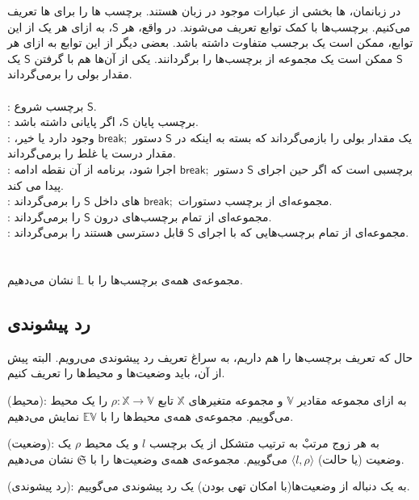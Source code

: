 در زبانمان، ها بخشی از عبارات موجود در زبان هستند. برچسب ها را برای ها تعریف می‌کنیم. برچسب‌ها با کمک توابع  تعریف می‌شوند. در‌ واقع، هر $\mathsf{S}$، به ازای هر یک از این توابع، ممکن است یک برجسب متفاوت داشته باشد. بعضی دیگر از این توابع به ازای هر $\mathsf{S}$ ممکن است یک مجموعه از برچسب‌ها را برگردانند. یکی از آن‌ها هم با گرفتن $\mathsf{S}$ یک مقدار بولی را بر‌می‌گرداند. 
\\\\
 : برچسب شروع $\mathsf{S}$.\\
 : برچسب پایان $\mathsf{S}$، اگر پایانی داشته باشد.\\
 : یک مقدار بولی را باز‌‌می‌گرداند که بسته به اینکه در $\mathsf{S}$ دستور $\mathsf{break;}$ وجود دارد یا خیر، مقدار درست یا غلط را بر‌می‌گرداند.\\
 : 
برچسبی است که اگر حین اجرای $\mathsf{S}$ دستور $\mathsf{break;}$ اجرا شود، برنامه از آن نقطه ادامه پیدا می کند.\\
 :
مجموعه‌ای از برچسب دستورات
$\mathsf{break;}$
های داخل $\mathsf{S}$ را بر‌می‌گرداند.\\
 : مجموعه‌ای از تمام برچسب‌های درون $\mathsf{S}$ را برمی‌گرداند.\\
 : مجموعه‌ای از تمام بر‌چسب‌هایی که با اجرای $\mathsf{S}$ قابل دسترسی هستند را بر‌می‌گرداند.\\\\\\
مجموعه‌ی همه‌ی برچسب‌ها را با 
$\mathbb{L}$
نشان می‌دهیم.

\subsection{رد پیشوندی}


حال که تعریف برچسب‌ها را هم داریم، به سراغ تعریف رد پیشوندی می‌رویم. البته پیش از آن، باید وضعیت‌ها و محیط‌ها را تعریف کنیم.
\begin{defn}
	(محیط): به ازای مجموعه مقادیر $\mathbb{V}$ و مجموعه متغیرهای $\mathbb{X}$ تابع 
	$\rho : \mathbb{X} \rightarrow \mathbb{V}$ 
	را یک محیط می‌گوییم. مجموعه‌ی همه‌ی محیط‌ها را با $\mathbb{EV}$ نمایش می‌دهیم.
\end{defn}

\begin{defn}
	(وضعیت): به هر زوج مرتبْ به ترتیب متشکل از یک برچسب $l$ و یک محیط $\rho$ یک وضعیت (یا حالت)  
	$\langle l , \rho \rangle$
	می‌گوییم. مجموعه‌ی همه‌ی وضعیت‌ها را با $\mathfrak{S}$ نشان می‌دهیم.
\end{defn}
\begin{defn}
	(رد پیشوندی): به یک دنباله از وضعیت‌ها(با امکان تهی بودن) یک رد پیشوندی می‌گوییم.
\end{defn}

